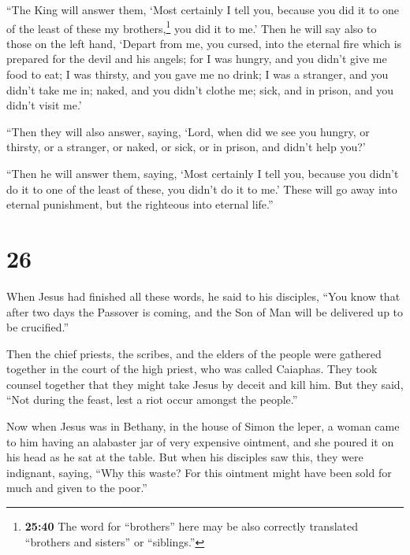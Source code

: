 ``The King will answer them, `Most certainly I tell you,
because you did it to one of the least of these my brothers,\footnote{\textbf{25:40}
  The word for ``brothers'' here may be also correctly translated
  ``brothers and sisters'' or ``siblings.''} you did it to me.'
 Then he will say also to those on the left hand, `Depart
from me, you cursed, into the eternal fire which is prepared for the
devil and his angels;  for I was hungry, and you didn't
give me food to eat; I was thirsty, and you gave me no drink;
 I was a stranger, and you didn't take me in; naked, and
you didn't clothe me; sick, and in prison, and you didn't visit me.'

 ``Then they will also answer, saying, `Lord, when did we
see you hungry, or thirsty, or a stranger, or naked, or sick, or in
prison, and didn't help you?'

 ``Then he will answer them, saying, `Most certainly I
tell you, because you didn't do it to one of the least of these, you
didn't do it to me.'  These will go away into eternal
punishment, but the righteous into eternal life.''

\hypertarget{section-25}{%
\section{26}\label{section-25}}

 When Jesus had finished all these words, he said to his
disciples,  ``You know that after two days the Passover is
coming, and the Son of Man will be delivered up to be crucified.''

 Then the chief priests, the scribes, and the elders of
the people were gathered together in the court of the high priest, who
was called Caiaphas.  They took counsel together that they
might take Jesus by deceit and kill him.  But they said,
``Not during the feast, lest a riot occur amongst the people.''

 Now when Jesus was in Bethany, in the house of Simon the
leper,  a woman came to him having an alabaster jar of
very expensive ointment, and she poured it on his head as he sat at the
table.  But when his disciples saw this, they were
indignant, saying, ``Why this waste?  For this ointment
might have been sold for much and given to the poor.''

